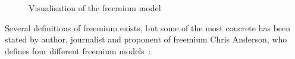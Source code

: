 \begin{figure}
    \centering
    \caption{Visualisation of the freemium model~\cite{chrisanderson2008}}
    \label{fig:freemium}
\end{figure}

Several definitions of freemium exists, but some of the most concrete has been stated by author, journalist and proponent of freemium Chris Anderson, who defines four different freemium models~\cite{chrisanderson2012}:

